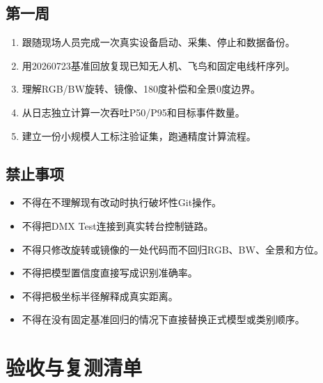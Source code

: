 \documentclass[UTF8,a4paper,11pt,openany]{ctexrep}
\begin{document}
\section{第一周}

\begin{enumerate}
  \item 跟随现场人员完成一次真实设备启动、采集、停止和数据备份。
  \item 用20260723基准回放复现已知无人机、飞鸟和固定电线杆序列。
  \item 理解RGB/BW旋转、镜像、180度补偿和全景0度边界。
  \item 从日志独立计算一次吞吐P50/P95和目标事件数量。
  \item 建立一份小规模人工标注验证集，跑通精度计算流程。
\end{enumerate}

\section{禁止事项}

\begin{itemize}
  \item 不得在不理解现有改动时执行破坏性Git操作。
  \item 不得把DMX Test连接到真实转台控制链路。
  \item 不得只修改旋转或镜像的一处代码而不回归RGB、BW、全景和方位。
  \item 不得把模型置信度直接写成识别准确率。
  \item 不得把极坐标半径解释成真实距离。
  \item 不得在没有固定基准回归的情况下直接替换正式模型或类别顺序。
\end{itemize}

\chapter{验收与复测清单}
\end{document}
